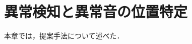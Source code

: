 \documentclass[../main]{subfiles}
\begin{document}
\section{異常検知と異常音の位置特定}
\label{sec:pmethod_conclusion}

本章では，提案手法について述べた．
\end{document}
